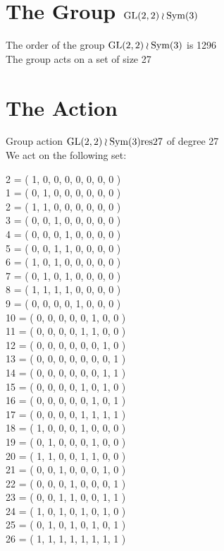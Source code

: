 \section*{The Group ${\rm GL}(2,2) \wr {\rm Sym}(3)$}
\noindent The order of the group ${\rm GL}(2,2) \wr {\rm Sym}(3)$ is 1296\\
\noindent The group acts on a set of size 27\\
\section*{The Action}
Group action ${\rm GL}(2,2) \wr {\rm Sym}(3) {\rm res27}$ of degree 27\\
We act on the following set:\\
\begin{multicols}{2}
 = ( 1, 0, 0, 0, 0, 0, 0, 0 )\\
1 = ( 0, 1, 0, 0, 0, 0, 0, 0 )\\
2 = ( 1, 1, 0, 0, 0, 0, 0, 0 )\\
3 = ( 0, 0, 1, 0, 0, 0, 0, 0 )\\
4 = ( 0, 0, 0, 1, 0, 0, 0, 0 )\\
5 = ( 0, 0, 1, 1, 0, 0, 0, 0 )\\
6 = ( 1, 0, 1, 0, 0, 0, 0, 0 )\\
7 = ( 0, 1, 0, 1, 0, 0, 0, 0 )\\
8 = ( 1, 1, 1, 1, 0, 0, 0, 0 )\\
9 = ( 0, 0, 0, 0, 1, 0, 0, 0 )\\
10 = ( 0, 0, 0, 0, 0, 1, 0, 0 )\\
11 = ( 0, 0, 0, 0, 1, 1, 0, 0 )\\
12 = ( 0, 0, 0, 0, 0, 0, 1, 0 )\\
13 = ( 0, 0, 0, 0, 0, 0, 0, 1 )\\
14 = ( 0, 0, 0, 0, 0, 0, 1, 1 )\\
15 = ( 0, 0, 0, 0, 1, 0, 1, 0 )\\
16 = ( 0, 0, 0, 0, 0, 1, 0, 1 )\\
17 = ( 0, 0, 0, 0, 1, 1, 1, 1 )\\
18 = ( 1, 0, 0, 0, 1, 0, 0, 0 )\\
19 = ( 0, 1, 0, 0, 0, 1, 0, 0 )\\
20 = ( 1, 1, 0, 0, 1, 1, 0, 0 )\\
21 = ( 0, 0, 1, 0, 0, 0, 1, 0 )\\
22 = ( 0, 0, 0, 1, 0, 0, 0, 1 )\\
23 = ( 0, 0, 1, 1, 0, 0, 1, 1 )\\
24 = ( 1, 0, 1, 0, 1, 0, 1, 0 )\\
25 = ( 0, 1, 0, 1, 0, 1, 0, 1 )\\
26 = ( 1, 1, 1, 1, 1, 1, 1, 1 )\\
\end{multicols}
